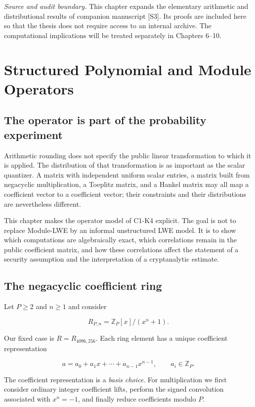 \documentclass[
  11pt,
  a4paper,
  oneside]{report}
\begin{document}
\emph{Source and audit boundary.} This chapter expands the elementary
arithmetic and distributional results of companion manuscript {[}S3{]}.
Its proofs are included here so that the thesis does not require access
to an internal archive. The computational implications will be treated
separately in Chapters 6--10.

\chapter{Structured Polynomial and Module
Operators}\label{structured-polynomial-and-module-operators}

\section{The operator is part of the probability
experiment}\label{the-operator-is-part-of-the-probability-experiment}

Arithmetic rounding does not specify the public linear transformation to
which it is applied. The distribution of that transformation is as
important as the scalar quantizer. A matrix with independent uniform
scalar entries, a matrix built from negacyclic multiplication, a
Toeplitz matrix, and a Hankel matrix may all map a coefficient vector to
a coefficient vector; their constraints and their distributions are
nevertheless different.

This chapter makes the operator model of C1-K4 explicit. The goal is not
to replace Module-LWE by an informal unstructured LWE model. It is to
show which computations are algebraically exact, which correlations
remain in the public coefficient matrix, and how these correlations
affect the statement of a security assumption and the interpretation of
a cryptanalytic estimate.

\section{The negacyclic coefficient
ring}\label{the-negacyclic-coefficient-ring}

Let \(P\ge2\) and \(n\ge1\) and consider

\[
R_{P,n}=\mathbb Z_P[x]/(x^n+1).
\]

Our fixed case is \(R=R_{4096,256}\). Each ring element has a unique
coefficient representation

\[
a=a_0+a_1x+\cdots+a_{n-1}x^{n-1},\qquad a_i\in\mathbb Z_P.
\]

The coefficient representation is a \emph{basis choice}. For
multiplication we first consider ordinary integer coefficient lifts,
perform the signed convolution associated with \(x^n=-1\), and finally
reduce coefficients modulo \(P\).
\end{document}
